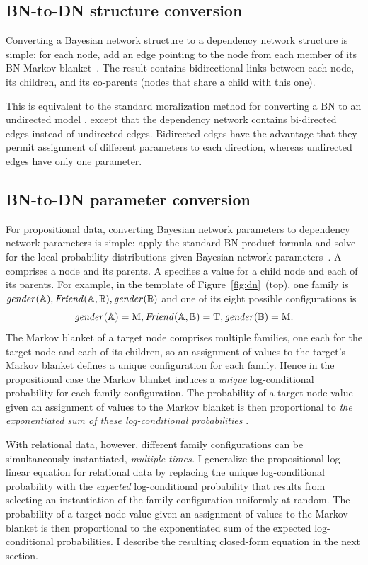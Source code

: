 \documentclass{sfuthesis}
\begin{document}
\subsection{BN-to-DN structure conversion}
Converting a Bayesian network structure to a dependency network structure is simple: for each node, add an edge pointing to the node from each member of its BN Markov blanket~\cite{Heckerman2000}.  The result contains  bidirectional links between each node, its children, and its co-parents (nodes that share a child with this one). 

This is equivalent to the standard moralization  method for converting a BN to an undirected model \cite{Domingos2009}, except that the dependency network contains bi-directed edges instead of undirected edges. Bidirected edges have the advantage that they permit  assignment of different parameters to each direction, whereas undirected edges have only one parameter. 


\subsection{BN-to-DN parameter conversion}  
For propositional data, converting Bayesian network parameters to dependency network parameters is simple: apply the standard BN product formula and solve for the local probability distributions given Bayesian network parameters~\cite[Ch.14.5.2]{Russell2010}. A  comprises a node and its parents. A  specifies a value for a child node and each of its parents. For example, in the template of Figure~\ref{fig:dn}~(top), one family is $\it{gender}(\mathbb{A}), \it{Friend}(\mathbb{A},\mathbb{B}), \it{gender}(\mathbb{B})$ and one of its eight possible configurations is
$$\it{gender}(\mathbb{A}) = \mathrm{M}, \it{Friend}(\mathbb{A},\mathbb{B}) = \mathrm{T}, \it{gender}(\mathbb{B}) = \mathrm{M}.$$
The Markov blanket of a target node comprises multiple families, one each for the target node and each of its children, so
an assignment of values to the target's Markov blanket defines a unique configuration for each family. Hence in the propositional case the Markov blanket induces a {\em unique} log-conditional probability for each family configuration. The probability of a target node value given an assignment of values to the Markov blanket is then proportional to {\em the exponentiated sum of these log-conditional probabilities} \cite[Ch.14.5.2]{Russell2010}.

With relational data, however, different family configurations can be simultaneously instantiated, {\em multiple times.}  I  generalize the propositional log-linear equation for relational data by replacing the unique log-conditional probability with the {\em expected} log-conditional probability that results from selecting an instantiation of the family configuration uniformly at random. The probability of a target node value given an assignment of values to the Markov blanket is then proportional to the exponentiated sum of the expected log-conditional probabilities. %
I  describe the resulting closed-form equation in the next section. 
\end{document}
